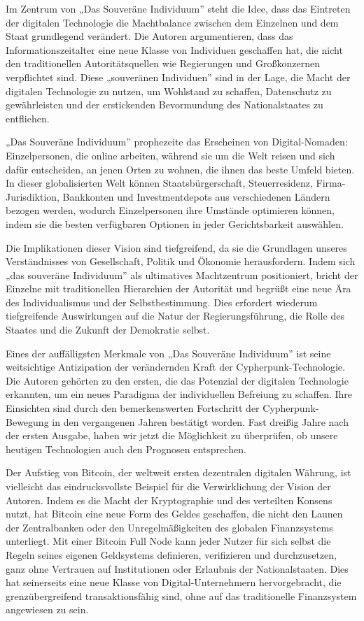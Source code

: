 \documentclass[
  a5paper,
  smalldemyvopaper,10pt,twoside,onecolumn,openright,extrafontsizes,hidelinks]{memoir}
\begin{document}
Im Zentrum von „Das Souveräne Individuum'' steht die Idee, dass das
Eintreten der digitalen Technologie die Machtbalance zwischen dem
Einzelnen und dem Staat grundlegend verändert. Die Autoren
argumentieren, dass das Informationszeitalter eine neue Klasse von
Individuen geschaffen hat, die nicht den traditionellen
Autoritätsquellen wie Regierungen und Großkonzernen verpflichtet sind.
Diese „souveränen Individuen'' sind in der Lage, die Macht der digitalen
Technologie zu nutzen, um Wohlstand zu schaffen, Datenschutz zu
gewährleisten und der erstickenden Bevormundung des Nationalstaates zu
entfliehen.

„Das Souveräne Individuum'' prophezeite das Erscheinen von
Digital-Nomaden: Einzelpersonen, die online arbeiten, während sie um die
Welt reisen und sich dafür entscheiden, an jenen Orten zu wohnen, die
ihnen das beste Umfeld bieten. In dieser globalisierten Welt können
Staatsbürgerschaft, Steuerresidenz, Firma-Jurisdiktion, Bankkonten und
Investmentdepots aus verschiedenen Ländern bezogen werden, wodurch
Einzelpersonen ihre Umstände optimieren können, indem sie die besten
verfügbaren Optionen in jeder Gerichtsbarkeit auswählen.

Die Implikationen dieser Vision sind tiefgreifend, da sie die Grundlagen
unseres Verständnisses von Gesellschaft, Politik und Ökonomie
herausfordern. Indem sich „das souveräne Individuum'' als ultimatives
Machtzentrum positioniert, bricht der Einzelne mit traditionellen
Hierarchien der Autorität und begrüßt eine neue Ära des Individualismus
und der Selbstbestimmung. Dies erfordert wiederum tiefgreifende
Auswirkungen auf die Natur der Regierungsführung, die Rolle des Staates
und die Zukunft der Demokratie selbst.

Eines der auffälligsten Merkmale von „Das Souveräne Individuum'' ist
seine weitsichtige Antizipation der verändernden Kraft der
Cypherpunk-Technologie. Die Autoren gehörten zu den ersten, die das
Potenzial der digitalen Technologie erkannten, um ein neues Paradigma
der individuellen Befreiung zu schaffen. Ihre Einsichten sind durch den
bemerkenswerten Fortschritt der Cypherpunk-Bewegung in den vergangenen
Jahren bestätigt worden. Fast dreißig Jahre nach der ersten Ausgabe,
haben wir jetzt die Möglichkeit zu überprüfen, ob unsere heutigen
Technologien auch den Prognosen entsprechen.

Der Aufstieg von Bitcoin, der weltweit ersten dezentralen digitalen
Währung, ist vielleicht das eindrucksvollste Beispiel für die
Verwirklichung der Vision der Autoren. Indem es die Macht der
Kryptographie und des verteilten Konsens nutzt, hat Bitcoin eine neue
Form des Geldes geschaffen, die nicht den Launen der Zentralbanken oder
den Unregelmäßigkeiten des globalen Finanzsystems unterliegt. Mit einer
Bitcoin Full Node kann jeder Nutzer für sich selbst die Regeln seines
eigenen Geldsystems definieren, verifizieren und durchzusetzen, ganz
ohne Vertrauen auf Institutionen oder Erlaubnis der Nationalstaaten.
Dies hat seinerseits eine neue Klasse von Digital-Unternehmern
hervorgebracht, die grenzübergreifend transaktionsfähig sind, ohne auf
das traditionelle Finanzsystem angewiesen zu sein.
\end{document}
